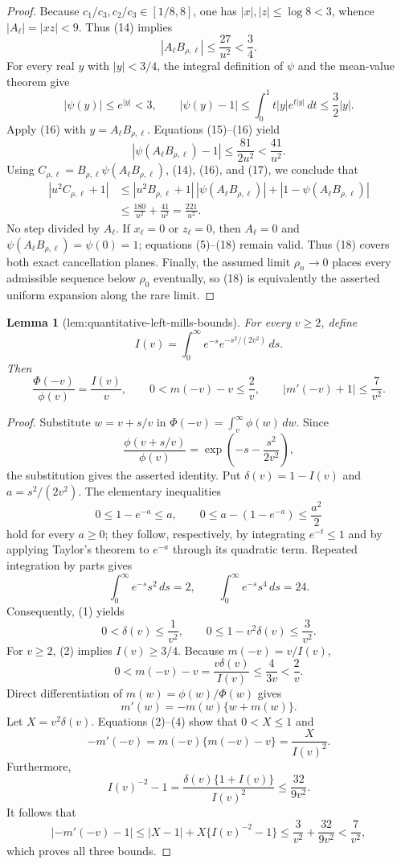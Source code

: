 \documentclass{article}
\newtheorem{lemma}{Lemma}
\begin{document}
\begin{proof}
Because \(c_1/c_3,c_2/c_3\in[1/8,8]\), one has \(|x|,|z|\le\log8<3\), whence \(|A_\ell|=|xz|<9\).  Thus (14) implies
\[
|A_\ell B_{\rho,\ell}|\le\frac{27}{u^2}<\frac34.
\tag{15}
\]
For every real \(y\) with \(|y|<3/4\), the integral definition of \(\psi\) and the mean-value theorem give
\[
|\psi(y)|\le e^{|y|}<3,
\qquad
|\psi(y)-1|
\le\int_0^1 t|y|e^{t|y|}\,dt
\le\frac32|y|.
\tag{16}
\]
Apply (16) with \(y=A_\ell B_{\rho,\ell}\).  Equations (15)--(16) yield
\[
\left|\psi(A_\ell B_{\rho,\ell})-1\right|
\le\frac{81}{2u^2}<\frac{41}{u^2}.
\tag{17}
\]
Using \(C_{\rho,\ell}=B_{\rho,\ell}\psi(A_\ell B_{\rho,\ell})\), (14), (16), and (17), we conclude that
\[
\begin{aligned}
|u^2C_{\rho,\ell}+1|
&\le |u^2B_{\rho,\ell}+1|\,
|\psi(A_\ell B_{\rho,\ell})|
+|1-\psi(A_\ell B_{\rho,\ell})|\\
&\le\frac{180}{u^2}+\frac{41}{u^2}
=\frac{221}{u^2}.
\end{aligned}
\tag{18}
\]
No step divided by \(A_\ell\).  If \(x_\ell=0\) or \(z_\ell=0\), then \(A_\ell=0\) and \(\psi(A_\ell B_{\rho,\ell})=\psi(0)=1\); equations (5)--(18) remain valid.  Thus (18) covers both exact cancellation planes.  Finally, the assumed limit \(\rho_n\to0\) places every admissible sequence below \(\rho_0\) eventually, so (18) is equivalently the asserted uniform expansion along the rare limit.
\end{proof}

\begin{lemma}[lem:quantitative-left-mills-bounds]\label{lem:quantitative-left-mills-bounds}
For every \(v\ge 2\), define
\[
I(v)=\int_0^\infty e^{-s}e^{-s^2/(2v^2)}\,ds.
\]
Then
\[
\frac{\Phi(-v)}{\phi(v)}=\frac{I(v)}{v},\qquad
0<m(-v)-v\le \frac{2}{v},
\qquad
\left|m'(-v)+1\right|\le \frac{7}{v^2}.
\]
\end{lemma}
\begin{proof}
Substitute \(w=v+s/v\) in \(\Phi(-v)=\int_v^\infty\phi(w)\,dw\).  Since
\[
\frac{\phi(v+s/v)}{\phi(v)}
=\exp\!\left(-s-\frac{s^2}{2v^2}\right),
\]
the substitution gives the asserted identity.  Put \(\delta(v)=1-I(v)\) and \(a=s^2/(2v^2)\).  The elementary inequalities
\[
0\le 1-e^{-a}\le a,
\qquad
0\le a-(1-e^{-a})\le \frac{a^2}{2}
\tag{1}
\]
hold for every \(a\ge0\); they follow, respectively, by integrating \(e^{-t}\le1\) and by applying Taylor's theorem to \(e^{-a}\) through its quadratic term.  Repeated integration by parts gives
\[
\int_0^\infty e^{-s}s^2\,ds=2,
\qquad
\int_0^\infty e^{-s}s^4\,ds=24.
\]
Consequently, (1) yields
\[
0<\delta(v)\le \frac1{v^2},
\qquad
0\le 1-v^2\delta(v)\le \frac3{v^2}.
\tag{2}
\]
For \(v\ge2\), (2) implies \(I(v)\ge3/4\).  Because \(m(-v)=v/I(v)\),
\[
0<m(-v)-v=\frac{v\delta(v)}{I(v)}
\le \frac{4}{3v}<\frac2v.
\tag{3}
\]
Direct differentiation of \(m(w)=\phi(w)/\Phi(w)\) gives
\[
m'(w)=-m(w)\{w+m(w)\}.
\tag{4}
\]
Let \(X=v^2\delta(v)\).  Equations (2)--(4) show that \(0<X\le1\) and
\[
-m'(-v)=m(-v)\{m(-v)-v\}=\frac{X}{I(v)^2}.
\]
Furthermore,
\[
I(v)^{-2}-1
=\frac{\delta(v)\{1+I(v)\}}{I(v)^2}
\le \frac{32}{9v^2}.
\]
It follows that
\[
\left|-m'(-v)-1\right|
\le |X-1|+X\{I(v)^{-2}-1\}
\le \frac3{v^2}+\frac{32}{9v^2}
<\frac7{v^2},
\]
which proves all three bounds.
\end{proof}
\end{document}
